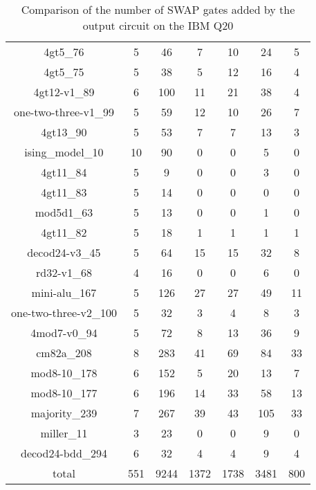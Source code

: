 \documentclass[runningheads]{llncs}
\begin{document}
\begin{table}[H]
\begin{center}
\begin{tabular}{|c|c|c|c|c|c|c|}
4gt5\_76 & 5 & 46 & 7 & 10 & 24 & 5 \\ 
4gt5\_75 & 5 & 38 & 5 & 12 & 16 & 4 \\ 
4gt12-v1\_89 & 6 & 100 & 11 & 21 & 38 & 4 \\ 
one-two-three-v1\_99 & 5 & 59 & 12 & 10 & 26 & 7 \\ 
4gt13\_90 & 5 & 53 & 7 & 7 & 13 & 3 \\ 
ising\_model\_10 & 10 & 90 & 0 & 0 & 5 & 0 \\ 
4gt11\_84 & 5 & 9 & 0 & 0 & 3 & 0 \\ 
4gt11\_83 & 5 & 14 & 0 & 0 & 0 & 0 \\ 
mod5d1\_63 & 5 & 13 & 0 & 0 & 1 & 0 \\ 
4gt11\_82 & 5 & 18 & 1 & 1 & 1 & 1 \\ 
decod24-v3\_45 & 5 & 64 & 15 & 15 & 32 & 8 \\ 
rd32-v1\_68 & 4 & 16 & 0 & 0 & 6 & 0 \\ 
mini-alu\_167 & 5 & 126 & 27 & 27 & 49 & 11 \\ 
one-two-three-v2\_100 & 5 & 32 & 3 & 4 & 8 & 3 \\ 
4mod7-v0\_94 & 5 & 72 & 8 & 13 & 36 & 9 \\ 
cm82a\_208 & 8 & 283 & 41 & 69 & 84 & 33 \\ 
mod8-10\_178 & 6 & 152 & 5 & 20 & 13 & 7 \\ 
mod8-10\_177 & 6 & 196 & 14 & 33 & 58 & 13 \\ 
majority\_239 & 7 & 267 & 39 & 43 & 105 & 33 \\ 
miller\_11 & 3 & 23 & 0 & 0 & 9 & 0 \\ 
decod24-bdd\_294 & 6 & 32 & 4 & 4 & 9 & 4 \\ 
\hline
total & 551 & 9244 & 1372 & 1738 & 3481 & 800 \\
		\hline
		\end{tabular} 
		\end{center} 
		\caption{Comparison of the number of SWAP gates added by the 
		output circuit on the IBM Q20 } 
		\label{tab3}
		\end{table}	
\end{document}
